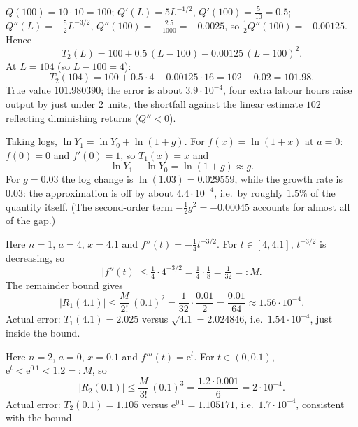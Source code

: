 \begin{solutions}
  \item $Q(100)=10\cdot 10=100$; $Q'(L)=5L^{-1/2}$,
        $Q'(100)=\tfrac{5}{10}=0.5$; $Q''(L)=-\tfrac52 L^{-3/2}$,
        $Q''(100)=-\tfrac{2.5}{1000}=-0.0025$, so
        $\tfrac12 Q''(100)=-0.00125$. Hence
        \[
          T_{2}(L)=100+0.5\,(L-100)-0.00125\,(L-100)^{2} .
        \]
        At $L=104$ (so $L-100=4$):
        \[
          T_{2}(104)=100+0.5\cdot 4-0.00125\cdot 16=102-0.02=101.98 .
        \]
        True value $101.980390$; the error is about
        $3.9\cdot 10^{-4}$, four extra labour hours raise output by
        just under $2$ units, the shortfall against the linear estimate
        $102$ reflecting diminishing returns ($Q''<0$).

  \item Taking logs, $\ln Y_{1}=\ln Y_{0}+\ln(1+g)$. For
        $f(x)=\ln(1+x)$ at $a=0$: $f(0)=0$ and $f'(0)=1$, so
        $T_{1}(x)=x$ and
        \[
          \ln Y_{1}-\ln Y_{0}=\ln(1+g)\approx g .
        \]
        For $g=0.03$ the log change is $\ln(1.03)=0.029559$, while the
        growth rate is $0.03$: the approximation is off by about
        $4.4\cdot 10^{-4}$, i.e.\ by roughly $1.5\%$ of the quantity
        itself. (The second-order term $-\tfrac12 g^{2}=-0.00045$
        accounts for almost all of the gap.)

  \item Here $n=1$, $a=4$, $x=4.1$ and $f''(t)=-\tfrac14 t^{-3/2}$.
        For $t\in[4,4.1]$, $t^{-3/2}$ is decreasing, so
        \[
          |f''(t)|\leq\tfrac14\cdot 4^{-3/2}=\tfrac14\cdot\tfrac18
                 =\tfrac{1}{32}=:M .
        \]
        The remainder bound gives
        \[
          |R_{1}(4.1)|\leq\frac{M}{2!}\,(0.1)^{2}
            =\frac{1}{32}\cdot\frac{0.01}{2}
            =\frac{0.01}{64}\approx 1.56\cdot 10^{-4} .
        \]
        Actual error: $T_{1}(4.1)=2.025$ versus $\sqrt{4.1}=2.024846$,
        i.e.\ $1.54\cdot 10^{-4}$, just inside the bound.

  \item Here $n=2$, $a=0$, $x=0.1$ and
        $f'''(t)=\mathrm{e}^{t}$. For $t\in(0,0.1)$,
        $\mathrm{e}^{t}<\mathrm{e}^{0.1}<1.2=:M$, so
        \[
          |R_{2}(0.1)|\leq\frac{M}{3!}\,(0.1)^{3}
            =\frac{1.2\cdot 0.001}{6}=2\cdot 10^{-4} .
        \]
        Actual error: $T_{2}(0.1)=1.105$ versus
        $\mathrm{e}^{0.1}=1.105171$, i.e.\ $1.7\cdot 10^{-4}$,
        consistent with the bound.


\end{solutions}
